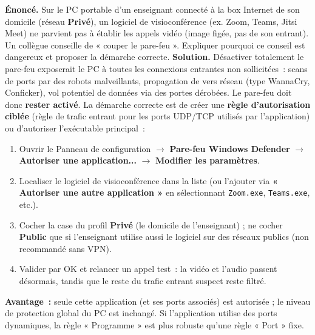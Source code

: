 \documentclass[11pt]{article}
\begin{document}
\begin{exoresolu}
\textbf{Énoncé.} Sur le PC portable d'un enseignant connecté à la box Internet de son domicile (réseau \textbf{Privé}), un logiciel de visioconférence (ex. Zoom, Teams, Jitsi Meet) ne parvient pas à établir les appels vidéo (image figée, pas de son entrant). Un collègue conseille de « couper le pare-feu ». Expliquer pourquoi ce conseil est dangereux et proposer la démarche correcte.
\tcblower
\textbf{Solution.} Désactiver totalement le pare-feu exposerait le PC à toutes les connexions entrantes non sollicitées~: scans de ports par des robots malveillants, propagation de vers réseau (type WannaCry, Conficker), vol potentiel de données via des portes dérobées. Le pare-feu doit donc \textbf{rester activé}. La démarche correcte est de créer une \textbf{règle d'autorisation ciblée} (règle de trafic entrant pour les ports UDP/TCP utilisés par l'application) ou d'autoriser l'exécutable principal~:
\begin{enumerate}
  \item Ouvrir le Panneau de configuration $\rightarrow$ \textbf{Pare-feu Windows Defender} $\rightarrow$ \textbf{Autoriser une application...} $\rightarrow$ \textbf{Modifier les paramètres}.
  \item Localiser le logiciel de visioconférence dans la liste (ou l'ajouter via \textbf{« Autoriser une autre application »} en sélectionnant \texttt{Zoom.exe}, \texttt{Teams.exe}, etc.).
  \item Cocher la case du profil \textbf{Privé} (le domicile de l'enseignant) ; ne cocher \textbf{Public} que si l'enseignant utilise aussi le logiciel sur des réseaux publics (non recommandé sans VPN).
  \item Valider par OK et relancer un appel test~: la vidéo et l'audio passent désormais, tandis que le reste du trafic entrant suspect reste filtré.
\end{enumerate}
\textbf{Avantage~:} seule cette application (et ses ports associés) est autorisée ; le niveau de protection global du PC est inchangé. Si l'application utilise des ports dynamiques, la règle « Programme » est plus robuste qu'une règle « Port » fixe.
\end{exoresolu}
\end{document}
